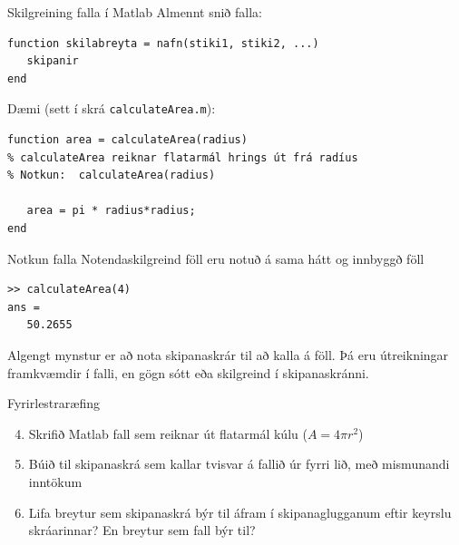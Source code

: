 \documentclass{beamer}
\begin{document}
\begin{frame}[fragile]{Skilgreining falla í Matlab}
Almennt snið falla:
\begin{verbatim}
function skilabreyta = nafn(stiki1, stiki2, ...)
   skipanir
end
\end{verbatim}
Dæmi (sett í skrá \texttt{calculateArea.m}):
\begin{verbatim}
function area = calculateArea(radius)
% calculateArea reiknar flatarmál hrings út frá radíus
% Notkun:  calculateArea(radius)

   area = pi * radius*radius;
end
\end{verbatim}

\end{frame}

\begin{frame}[fragile]{Notkun falla}
Notendaskilgreind föll eru notuð á sama hátt og innbyggð föll
\begin{verbatim}
>> calculateArea(4)
ans =
   50.2655
\end{verbatim}
Algengt mynstur er að nota skipanaskrár til að kalla á föll. Þá eru útreikningar framkvæmdir í falli, en gögn sótt eða skilgreind í skipanaskránni.
\end{frame}

\begin{frame}{Fyrirlestraræfing}

\begin{enumerate}
\setcounter{enumi}{3}
 \item Skrifið Matlab fall sem reiknar út flatarmál kúlu ($A = 4\pi r^2$)
 \item Búið til skipanaskrá sem kallar tvisvar á fallið úr fyrri lið, með mismunandi inntökum
 \item Lifa breytur sem skipanaskrá býr til áfram í skipanaglugganum eftir keyrslu skráarinnar? En breytur sem fall býr til?
\end{enumerate}

 
\end{frame}
\end{document}
